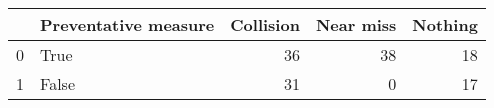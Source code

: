\begin{tabular}{llrrr}
\toprule
{} &  Preventative measure &  Collision &  Near miss &  Nothing \\
\midrule
0 &                  True &         36 &         38 &       18 \\
1 &                 False &         31 &          0 &       17 \\
\bottomrule
\end{tabular}
